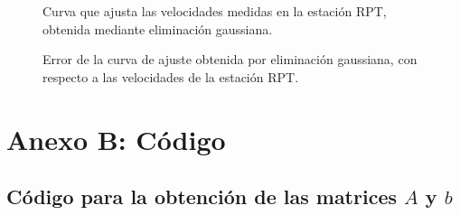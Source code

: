 \documentclass[%
	final,
	reprint,
	notitlepage,
	narroweqnarray,
	inline,
	twoside,
	invited
	]{ieee}
\begin{document}
\begin{figure}[H]
\centering
\caption{Curva que ajusta las velocidades medidas en la estación RPT, obtenida mediante eliminación gaussiana.}
\label{dataRPT}
\end{figure}

\begin{figure}[H]
\centering
\caption{Error de la curva de ajuste obtenida por eliminación gaussiana, con respecto a las velocidades de la estación RPT.}
\label{dataRPT}
\end{figure}

\clearpage



\section*{Anexo B: Código}

\subsection{Código para la obtención de las matrices $A$ y $b$}

\end{document}
